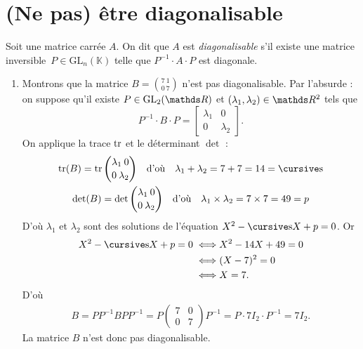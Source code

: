 \section{(Ne pas) être diagonalisable}

\begin{defn}
	Soit une matrice carrée $A$. On dit que $A$\/ est {\it diagonalisable}\/ s'il existe une matrice inversible~$P \in \mathrm{GL}_n(\mathds{K})$\/ telle que $P^{-1}\cdot A\cdot P$\/ est diagonale.
\end{defn}

\begin{exo}
	\begin{enumerate}
		\item Montrons que la matrice $B = {7\: 1\choose 0\:7}$\/ n'est pas diagonalisable.
			Par l'absurde : on suppose qu'il existe $P \in \mathrm{GL}_2(\R)$\/ et $(\lambda_1, \lambda_2) \in \R^2$\/ tels que \[
				P^{-1} \cdot B \cdot P = \begin{bmatrix}
					\lambda_1 & 0\\
					0&\lambda_2
				\end{bmatrix}
			.\] On applique la trace $\operatorname{tr}$\/ et le déterminant $\det$\/ :
			\begin{gather*}
				\tr(B) = \tr{\lambda_1\:0\choose 0\:\lambda_2} \quad\text{d'où}\quad \lambda_1 + \lambda_2 = 7 + 7 = 14 = \s\\
				\det(B) = \det{\lambda_1\:0\choose 0\:\lambda_2} \quad\text{d'où}\quad \lambda_1 \times \lambda_2 = 7 \times 7 = 49 = p
			\end{gather*}
			D'où $\lambda_1$\/ et $\lambda_2$\/ sont des solutions de l'équation $X^2 - \s X + p = 0$. Or
			\begin{align*}
				X^2 - \s X + p = 0 \iff& X^2 - 14X + 49 = 0\\
				\iff& (X-7)^2 = 0\\
				\iff& X = 7.
			\end{align*}
			D'où 
			\begin{align*}
				B = P P^{-1} B P P^{-1} = P \begin{pmatrix}
					7&0\\
					0&7
				\end{pmatrix} P^{-1} = P \cdot 7I_2\cdot P^{-1} = 7I_2.
			\end{align*}
			La matrice $B$\/ n'est donc pas diagonalisable.


\end{enumerate}
\end{exo}
